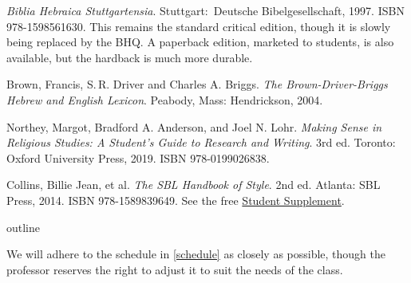 \documentclass[titlepage]{article}
\begin{document}
\begingroup
\renewcommand{\section}[2]{}%
\begin{thebibliography}{Making Sense}%

    \emph{Biblia Hebraica Stuttgartensia}.
    Stuttgart: Deutsche Bibel\-ge\-sell\-schaft, 1997. ISBN 978-1598561630.
    This remains the standard critical edition, though it is slowly
    being replaced by the BHQ. A paperback edition, marketed to
    students, is also available, but the hardback is much more durable.

	Brown, Francis, S.\,R. Driver and Charles A. Briggs. \emph{The
	Brown-Driver-Briggs Hebrew and English Lexicon}. Peabody, Mass:
	Hendrickson, 2004.

	 Northey, Margot, Bradford A. Anderson, and Joel N. Lohr.
	\emph{Making Sense in Religious Studies: A Student's Guide to Research and Writing}.
	3rd ed. Toronto: Oxford University Press, 2019. ISBN 978-0199026838.

	 Collins, Billie Jean, et al.
	\emph{The SBL Handbook of Style}.
	2nd ed. Atlanta: SBL Press, 2014. ISBN 978-1589839649. See the free
	\href{https://www.sbl-site.org/assets/pdfs/pubs/SBLHSsupp2015-02.pdf}{Student Supplement}.

\end{thebibliography}
\endgroup

\section{Course Outline}
\label{outline}

We will adhere to the schedule in \autoref{schedule} as closely as
possible, though the professor reserves the right to adjust it to suit
the needs of the class.
\end{document}
